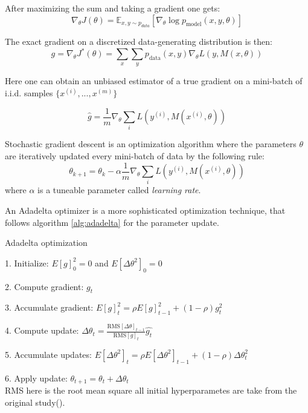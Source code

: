 After maximizing the sum and taking a gradient one gets:
\begin{equation}
	\nabla_{\theta} J(\theta) = \mathbb{E}_{x, y \sim p_{data}} \left[\nabla_{\theta} \log{p_{\text{model}}(x, y, \theta)}\right]
\end{equation}

The exact gradient on a discretized data-generating distribution is then:
\begin{equation}
	g = \nabla_{\theta} J^*(\theta) = \sum_{x} \sum_{y}{p_{\text{data}}(x, y) \nabla_{\theta} L(y, M(x, \theta))}
\end{equation}

Here one can obtain an unbiased estimator of a true gradient on a mini-batch of i.i.d. samples $\{x^{(i)}, ..., x^{(m)}\}$	

\begin{equation}
	\hat{g} = \frac{1}{m} \nabla_\theta \sum_{i} L(y^{(i)}, M(x^{(i)}, \theta))
\end{equation}

\begin{definition}
	Stochastic gradient descent is an optimization algorithm where the parameters $\theta$ are iteratively updated every mini-batch of data by the following rule:
	\begin{equation}
		\theta_{k+1} = \theta_k - \alpha \frac{1}{m} \nabla_\theta \sum_{i} L(y^{(i)}, M(x^{(i)}, \theta))
	\end{equation}
	where $\alpha$ is a tuneable parameter called \textit {learning rate}.
\end{definition}

\begin{definition}
	An Adadelta optimizer is a more sophisticated optimization technique, that follows algorithm \ref{alg:adadelta} for the parameter update.
	\begin{algorithm}[H]
		\caption{Adadelta optimization}\label{alg:adadelta}
		\item 1. Initialize: $E[g]^2_0 = 0$ and $E[\Delta \theta^2]_0 = 0$
		\item 2. Compute gradient: $g_t$
		\item 3. Accumulate gradient: $E[g]^2_t = \rho E[g]^2_{t - 1} + (1 - \rho)g_t^2$
		\item 4. Compute update: $\Delta \theta_t = \frac{\text{RMS}[\Delta \theta]_{t-1}}{\text{RMS}[g]_t} \hat{g_t}$
		\item 5. Accumulate updates: $E[\Delta \theta^2]_t = \rho E[\Delta \theta^2]_{t-1} + (1 - \rho) \Delta \theta^2_t$
		\item 6. Apply update: $\theta_{t+1} = \theta_t + \Delta \theta_t$ \\
		RMS here is the root mean square all initial hyperparametes are take from the original study(\cite{Zeiler_2012}).
	\end{algorithm}
\end{definition}

